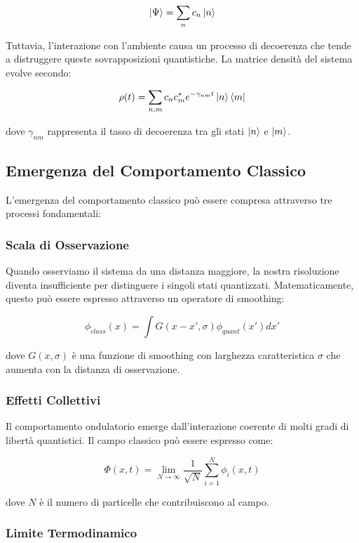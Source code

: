 \documentclass{gs-adonis}
\begin{document}
\[\ket{\Psi} = \sum_n c_n \ket{n}\]

Tuttavia, l'interazione con l'ambiente causa un processo di decoerenza
che tende a distruggere queste sovrapposizioni quantistiche. La matrice
densità del sistema evolve secondo:

\[\rho(t) = \sum_{n,m} c_n c_m^* e^{-\gamma_{nm}t} \ket{n}\bra{m}\]

dove \(\gamma_{nm}\) rappresenta il tasso di decoerenza tra gli stati
\(\ket{n}\) e \(\ket{m}\).

\subsection{Emergenza del Comportamento
Classico}\label{emergenza-del-comportamento-classico}

L'emergenza del comportamento classico può essere compresa attraverso
tre processi fondamentali:

\subsubsection{Scala di Osservazione}\label{scala-di-osservazione}

Quando osserviamo il sistema da una distanza maggiore, la nostra
risoluzione diventa insufficiente per distinguere i singoli stati
quantizzati. Matematicamente, questo può essere espresso attraverso un
operatore di smoothing:

\[\phi_{class}(x) = \int G(x-x', \sigma) \phi_{quant}(x') dx'\]

dove \(G(x,\sigma)\) è una funzione di smoothing con larghezza
caratteristica \(\sigma\) che aumenta con la distanza di osservazione.

\subsubsection{Effetti Collettivi}\label{effetti-collettivi}

Il comportamento ondulatorio emerge dall'interazione coerente di molti
gradi di libertà quantistici. Il campo classico può essere espresso
come:

\[\Phi(x,t) = \lim_{N \to \infty} \frac{1}{\sqrt{N}} \sum_{i=1}^N \phi_i(x,t)\]

dove \(N\) è il numero di particelle che contribuiscono al campo.

\subsubsection{Limite Termodinamico}\label{limite-termodinamico}
\end{document}
